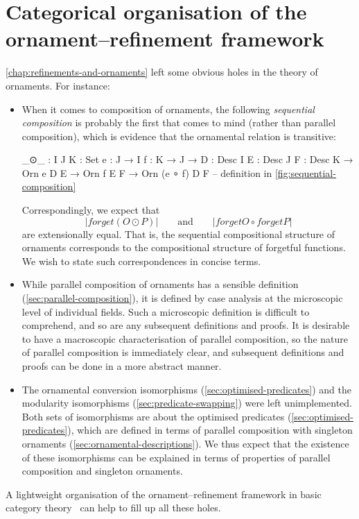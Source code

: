 \chapter{Categorical organisation of the ornament--refinement framework}
\label{chap:categorical}

\autoref{chap:refinements-and-ornaments} left some obvious holes in the theory of ornaments.
For instance:
\begin{itemize}
\item When it comes to composition of ornaments, the following \emph{sequential composition} is probably the first that comes to mind (rather than parallel composition), which is evidence that the ornamental relation is transitive:
\begin{code}
_⊙_ :  {I J K : Set} {e : J → I} {f : K → J} →
       {D : Desc I} {E : Desc J} {F : Desc K} →
       Orn e D E → Orn f E F → Orn (e ∘ f) D F
-- definition in \autoref{fig:sequential-composition}
\end{code}
Correspondingly, we expect that
\[ |forget (O ⊙ P)| \qquad\text{and}\qquad |forget O ∘ forget P| \]
are extensionally equal.
That is, the sequential compositional structure of ornaments corresponds to the compositional structure of forgetful functions.
We wish to state such correspondences in concise terms.
\item While parallel composition of ornaments has a sensible definition (\autoref{sec:parallel-composition}), it is defined by case analysis at the microscopic level of individual fields.
Such a microscopic definition is difficult to comprehend, and so are any subsequent definitions and proofs.
It is desirable to have a macroscopic characterisation of parallel composition, so the nature of parallel composition is immediately clear, and subsequent definitions and proofs can be done in a more abstract manner.
\item The ornamental conversion isomorphisms (\autoref{sec:optimised-predicates}) and the modularity isomorphisms (\autoref{sec:predicate-swapping}) were left unimplemented.
Both sets of isomorphisms are about the optimised predicates (\autoref{sec:optimised-predicates}), which are defined in terms of parallel composition with singleton ornaments (\autoref{sec:ornamental-descriptions}).
We thus expect that the existence of these isomorphisms can be explained in terms of properties of parallel composition and singleton ornaments.
\end{itemize}
A lightweight organisation of the ornament--refinement framework in basic category theory~\citep{MacLane-categories} can help to fill up all these holes.
